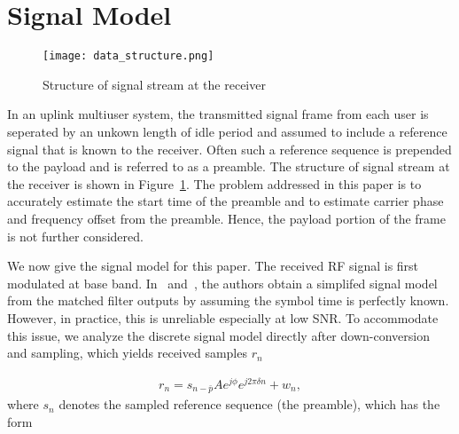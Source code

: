 \section{Signal Model}
\label{sec:model}

\begin{figure}[t]
  \centerline{\texttt{[image: data\_structure.png]}}
  \caption{Structure of signal stream at the receiver}
  \label{fig:data_structure}
  \end{figure}

In an uplink multiuser system, the transmitted signal frame from each user is seperated by an unkown length of idle period and assumed to include a reference signal that is known to the receiver.
Often such a reference sequence is prepended to the payload and is referred to as a preamble.
The structure of signal stream at the receiver is shown in Figure~\ref{fig:data_structure}. 
The problem addressed in this paper is to accurately estimate the start time of the preamble and to estimate carrier phase and frequency offset from the preamble.
Hence, the payload portion of the frame is not further considered. 

We now give the signal model for this paper. The received RF signal is first modulated at base band.
In~\cite{Morelli_Mengali_98} and~\cite{Ramakrishnan_10}, 
the authors obtain a simplifed signal model from the matched filter outputs by assuming the symbol time is perfectly known.
However, in practice, this is unreliable especially at low SNR. To accommodate this issue, we analyze the discrete signal model
directly after down-conversion and sampling, which yields received samples $r_n$

\begin{equation}
    \begin{aligned}
      \label{eq:model}
      r_n = s_{n-\bar{p}}Ae^{j\phi}e^{j2\pi\delta n}+w_{n},
    \end{aligned}
  \end{equation}
where $s_n$ denotes the sampled reference sequence (the preamble), which has the form

